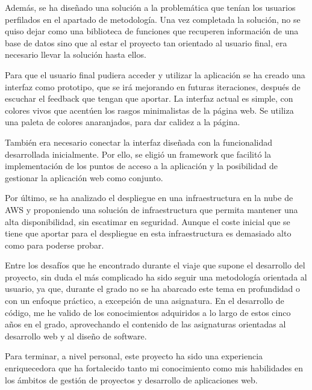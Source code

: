 Además, se ha diseñado una solución a la problemática que tenían los usuarios perfilados en el apartado de metodología. Una vez completada la solución, no se quiso dejar como una biblioteca de funciones que recuperen información de una base de datos sino que al estar el proyecto tan orientado al usuario final, era necesario llevar la solución hasta ellos.

Para que el usuario final pudiera acceder y utilizar la aplicación se ha creado una interfaz como prototipo, que se irá mejorando en futuras iteraciones, después de escuchar el feedback que tengan que aportar. La interfaz actual es simple, con colores vivos que acentúen los rasgos minimalistas de la página web. Se utiliza una paleta de colores anaranjados, para dar calidez a la página. 

También era necesario conectar la \gls{interfaz} diseñada con la funcionalidad desarrollada inicialmente. Por ello, se eligió un \gls{framework} que facilitó la implementación de los puntos de acceso a la aplicación y la posibilidad de gestionar la aplicación web como conjunto. 

Por último, se ha analizado el despliegue en una infraestructura en la nube de \gls{AWS} y proponiendo una solución de infraestructura que permita mantener una alta disponibilidad, sin escatimar en seguridad. Aunque el coste inicial que se tiene que aportar para el despliegue en esta infraestructura es demasiado alto como para poderse probar. 

Entre los desafíos que he encontrado durante el viaje que supone el desarrollo del proyecto, sin duda el más complicado ha sido seguir una metodología orientada al usuario, ya que, durante el grado no se ha abarcado este tema en profundidad o con un enfoque práctico, a excepción de una asignatura. En el desarrollo de código, me he valido de los conocimientos adquiridos a lo largo de estos cinco años en el grado, aprovechando el contenido de las asignaturas orientadas al desarrollo web y al diseño de software.

Para terminar, a nivel personal, este proyecto ha sido una experiencia enriquecedora que ha fortalecido tanto mi conocimiento como mis habilidades en los ámbitos de gestión de proyectos y desarrollo de aplicaciones web. 